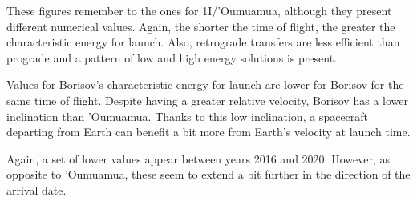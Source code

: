 These figures remember to the ones for 1I/'Oumuamua, although they present
different numerical values. Again, the shorter the time of flight, the greater
the characteristic energy for launch. Also, retrograde transfers are less
efficient than prograde and a pattern of low and high energy solutions is
present.

Values for Borisov's characteristic energy for launch are lower for Borisov for
the same time of flight. Despite having a greater relative velocity, Borisov has
a lower inclination than 'Oumuamua. Thanks to this low inclination, a spacecraft
departing from Earth can benefit a bit more from Earth's velocity at launch
time.

Again, a set of lower values appear between years 2016 and 2020. However, as
opposite to 'Oumuamua, these seem to extend a bit further in the direction of
the arrival date.

